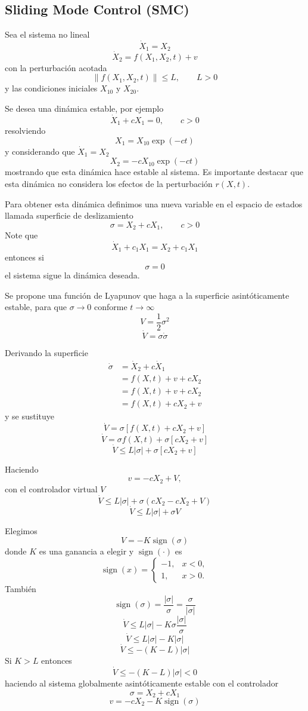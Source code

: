 \clearpage
\begin{flushright}
\end{flushright}

\subsection{Sliding Mode Control (SMC)}

Sea el sistema no lineal
\[
  \dot{X}_1=X_2
\]
\[
  \dot{X}_2=f(X_1,X_2,t)+v
\]
con la perturbación acotada
\[
  \lVert f(X_1,X_2,t)\rVert\leq L,
  \qquad L>0
\]
y las condiciones iniciales $X_{10}$ y $X_{20}$.

Se desea una dinámica estable, por ejemplo
\[
  \dot{X}_1+cX_1=0,
  \qquad c>0
\]
resolviendo
\[
  X_1=X_{10}\exp(-ct)
\]
y considerando que $\dot{X}_1=X_2$
\[
  X_2=-cX_{10}\exp(-ct)
\]
mostrando que esta dinámica hace estable al sistema. Es importante destacar
que esta dinámica no considera los efectos de la perturbación $r(X,t)$.

Para obtener esta dinámica definimos una nueva variable en el espacio de
estados llamada superficie de deslizamiento
\[
  \sigma=X_2+cX_1,
  \qquad c>0
\]
Note que
\[
  \dot{X}_1+c_1X_1=X_2+c_1X_1
\]
entonces si
\[
  \sigma=0
\]
el sistema sigue la dinámica deseada.

Se propone una función de Lyapunov que haga a la superficie asintóticamente
estable, para que $\sigma\to0$ conforme $t\to\infty$
\[
  V=\frac{1}{2}\sigma^2
\]
\[
  \dot{V}=\sigma\dot{\sigma}
\]

Derivando la superficie
\begin{align*}
  \dot{\sigma}
  &=\dot{X}_2+c\dot{X}_1\\
  &=f(X,t)+v+cX_2\\
  &=f(X,t)+v+cX_2\\
  &=f(X,t)+cX_2+v
\end{align*}
y se sustituye
\[
  \dot{V}=\sigma\left[f(X,t)+cX_2+v\right]
\]
\[
  \dot{V}=\sigma f(X,t)+\sigma[cX_2+v]
\]
\[
  \dot{V}\leq L\lvert\sigma\rvert+\sigma[cX_2+v]
\]

Haciendo
\[
  v=-cX_2+V,
\]
con el controlador virtual $V$
\[
  \dot{V}\leq L\lvert\sigma\rvert
  +\sigma(cX_2-cX_2+V)
\]
\[
  \dot{V}\leq L\lvert\sigma\rvert+\sigma V
\]

Elegimos
\[
  V=-K\operatorname{sign}(\sigma)
\]
donde $K$ es una ganancia a elegir y $\operatorname{sign}(\cdot)$ es
\[
  \operatorname{sign}(x)=
  \begin{cases}
    -1, & x<0,\\
    1, & x>0.
  \end{cases}
\]
También
\[
  \operatorname{sign}(\sigma)
  =\frac{\lvert\sigma\rvert}{\sigma}
  =\frac{\sigma}{\lvert\sigma\rvert}
\]
\[
  \dot{V}\leq L\lvert\sigma\rvert
  -K\sigma\frac{\lvert\sigma\rvert}{\sigma}
\]
\[
  \dot{V}\leq L\lvert\sigma\rvert-K\lvert\sigma\rvert
\]
\[
  \dot{V}\leq-(K-L)\lvert\sigma\rvert
\]
Si $K>L$ entonces
\[
  \dot{V}\leq-(K-L)\lvert\sigma\rvert<0
\]
haciendo al sistema globalmente asintóticamente estable con el controlador
\[
  \sigma=X_2+cX_1
\]
\[
  v=-cX_2-K\operatorname{sign}(\sigma)
\]